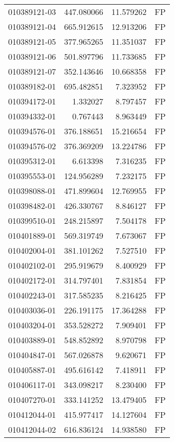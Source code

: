 \begin{tabular}{lrrl}
010389121-03 &  447.080066 &    11.579262 &   FP \\
010389121-04 &  665.912615 &    12.913206 &   FP \\
010389121-05 &  377.965265 &    11.351037 &   FP \\
010389121-06 &  501.897796 &    11.733685 &   FP \\
010389121-07 &  352.143646 &    10.668358 &   FP \\
010389182-01 &  695.482851 &     7.323952 &   FP \\
010394172-01 &    1.332027 &     8.797457 &   FP \\
010394332-01 &    0.767443 &     8.963449 &   FP \\
010394576-01 &  376.188651 &    15.216654 &   FP \\
010394576-02 &  376.369209 &    13.224786 &   FP \\
010395312-01 &    6.613398 &     7.316235 &   FP \\
010395553-01 &  124.956289 &     7.232175 &   FP \\
010398088-01 &  471.899604 &    12.769955 &   FP \\
010398482-01 &  426.330767 &     8.846127 &   FP \\
010399510-01 &  248.215897 &     7.504178 &   FP \\
010401889-01 &  569.319749 &     7.673067 &   FP \\
010402004-01 &  381.101262 &     7.527510 &   FP \\
010402102-01 &  295.919679 &     8.400929 &   FP \\
010402172-01 &  314.797401 &     7.831854 &   FP \\
010402243-01 &  317.585235 &     8.216425 &   FP \\
010403036-01 &  226.191175 &    17.364288 &   FP \\
010403204-01 &  353.528272 &     7.909401 &   FP \\
010403889-01 &  548.852892 &     8.970798 &   FP \\
010404847-01 &  567.026878 &     9.620671 &   FP \\
010405887-01 &  495.616142 &     7.418911 &   FP \\
010406117-01 &  343.098217 &     8.230400 &   FP \\
010407270-01 &  333.141252 &    13.479405 &   FP \\
010412044-01 &  415.977417 &    14.127604 &   FP \\
010412044-02 &  616.836124 &    14.938580 &   FP \\

\end{tabular}
